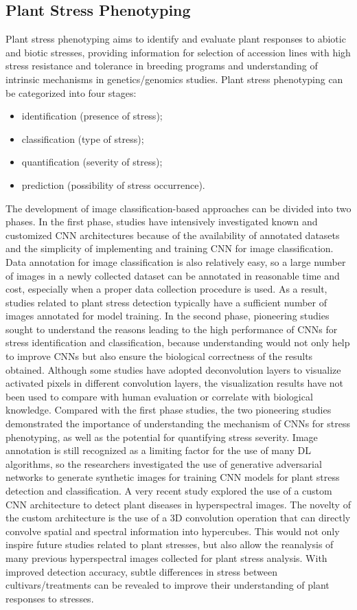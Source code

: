 \subsection{Plant Stress Phenotyping}
Plant stress phenotyping aims to identify and evaluate plant responses to abiotic and biotic stresses, providing information for selection of accession lines
with high stress resistance and tolerance in breeding programs and understanding of intrinsic mechanisms in genetics/genomics studies.
Plant stress phenotyping can be categorized into four stages:
\begin{itemize}
\item identification (presence of stress);
\item classification (type of stress); 
\item quantification (severity of stress);
\item prediction (possibility of stress occurrence).
\end{itemize}
The development of image classification-based approaches can be divided into two phases. In the first phase, studies have intensively investigated known
and customized CNN architectures because of the availability of annotated datasets and the simplicity of implementing and training CNN for image classification.
Data annotation for image classification is also relatively easy, so a large number of images in a newly collected dataset can be annotated in reasonable time and
cost, especially when a proper data collection procedure is used. As a result, studies related to plant stress detection typically have a sufficient number of
images annotated for model training. In the second phase, pioneering studies sought to understand the reasons leading to the high performance of CNNs for stress
identification and classification, because understanding would not only help to improve CNNs but also ensure the biological correctness of the results obtained.
Although some studies have adopted deconvolution layers to visualize activated pixels in different convolution layers, the visualization results have not been
used to compare with human evaluation or correlate with biological knowledge. Compared with the first phase studies, the two pioneering studies demonstrated the importance of
understanding the mechanism of CNNs for stress phenotyping, as well as the potential for quantifying stress severity. Image annotation is still recognized as a limiting factor
for the use of many DL algorithms, so the researchers investigated the use of generative adversarial networks to generate synthetic images for training CNN models for
plant stress detection and classification. A very recent study explored the use of a custom CNN architecture to detect plant diseases in hyperspectral images.
The novelty of the custom architecture is the use of a 3D convolution operation that can directly convolve spatial and spectral information into hypercubes.
This would not only inspire future studies related to plant stresses, but also allow the reanalysis of many previous hyperspectral images collected for plant
stress analysis. With improved detection accuracy, subtle differences in stress between cultivars/treatments can be revealed to improve their understanding of plant
responses to stresses.

